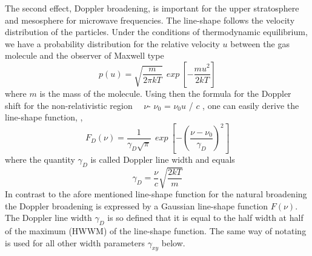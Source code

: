 The second effect, Doppler broadening, is important for the upper
stratosphere and mesosphere for microwave frequencies. The line-shape
follows the velocity distribution of the particles. Under the conditions
of thermodynamic equilibrium, we have  a probability distribution for
the relative velocity $u$ between the gas molecule and the observer 
of Maxwell type 
\begin{equation}\label{maxwell_distribution}
  p(u)=\sqrt{\frac{m}{2\pi kT}}~~exp~\left[-\frac{mu^2}{2kT}\right]
\end{equation}
where $m$ is the mass of the molecule. Using then the formula for the
Doppler shift for the non-relativistic region~~  $\nu$- $\nu_0$ =
$\nu_0$$u$ / $c$ , one can easily derive the line-shape function, \citet{bernath:95}, 
\begin{equation}
 F_D(\nu)=\frac{1}{\gamma_D\sqrt{\pi}}~~exp~\left[-\left(\frac{\nu - \nu_0}{\gamma_D}\right)^2\right]
\end{equation}
where the quantity $\gamma_D$ is called Doppler line width and equals
\begin{equation}
 \gamma_D=\frac{\nu}{c}\sqrt{\frac{2kT}{m}}
\end{equation}
In contrast to the afore mentioned line-shape function for the natural
broadening the Doppler broadening is expressed by a Gaussian
line-shape function $F(\nu)$. The Doppler line width $\gamma_D$ is so
defined that it is equal to the half width at half of the maximum
(HWWM) of the line-shape function. The same way of notating is used
for all other width parameters $\gamma_{xy}$ below.

